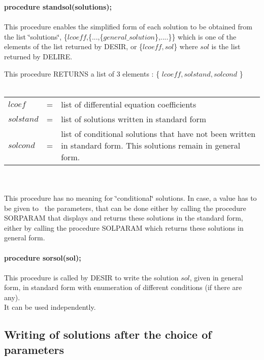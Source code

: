 \documentclass[a4paper]{article}
\begin{document}
{\bf procedure standsol(solutions);} \\
\ \\
This procedure enables the simplified form of each solution to be obtained
from the list \char`\"{}solutions\char`\"{}, \{$lcoeff$,\{...,\{$general\_solution$\},....\}\}
which is one of the elements of the list returned by DESIR, or \{$lcoeff,sol$\} where
$sol$ is the list returned by DELIRE. \par
This procedure RETURNS a list of 3 elements : \{ $lcoeff, solstand, solcond$ \} \\
\ \\
\begin{tabular}{lcp{9cm}}
$lcoef$ & = & list of differential equation coefficients \\
$solstand$ & = & list of solutions written in standard form \\
$solcond$ & = & list of conditional solutions that have not been written
              in standard form. This solutions remain in general form. \\
\end{tabular} \\
\ \\
This procedure has no meaning for \char`\"{}conditional\char`\"{} solutions.
In case, a value has to be given to~ the parameters, that can be done either by 
calling the procedure SORPARAM that displays and returns these solutions in the
standard form, either by calling the procedure SOLPARAM which returns
these solutions in general form. \\
\ \\
{\bf procedure sorsol(sol);} \\
\ \\
This procedure is called by DESIR to write the solution $sol$, given in
general form, in standard form with enumeration of different conditions (if
there are any). \\
It can be used independently.

\subsection{Writing of solutions after the choice of parameters}
\end{document}
